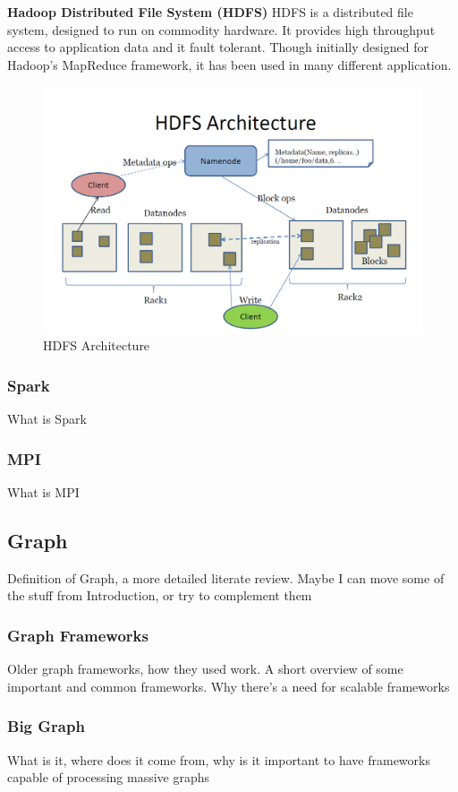 \documentclass[english]{tktltiki}
\begin{document}
\textbf{Hadoop Distributed File System (HDFS)}
HDFS is a distributed file system, designed to run on commodity hardware. It provides high throughput access to application data and it fault tolerant. Though initially designed for Hadoop's MapReduce framework, it has been used in many different application.
\begin{figure}[ht!]
\centering
\includegraphics[width=130mm]{figures/hdfsarchitecture.png}
\caption{HDFS Architecture}
\end{figure}


\subsubsection{Spark}
What is Spark
\subsubsection{MPI}
What is MPI

\subsection{Graph}
Definition of Graph, a more detailed literate review. Maybe I can move some of the stuff from Introduction, or try to complement them

\subsubsection{Graph Frameworks}
Older graph frameworks, how they used work. A short overview of some important and common frameworks. Why there's a need for scalable frameworks

\subsubsection{Big Graph}
What is it, where does it come from, why is it important to have frameworks capable of processing massive graphs
\end{document}
